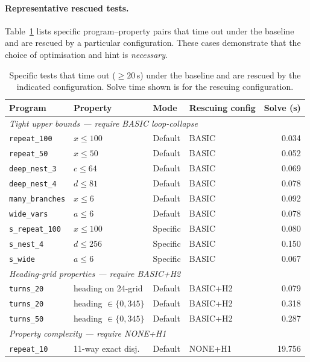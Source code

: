 \paragraph{Representative rescued tests.}
Table~\ref{tab:rescued-examples-m3} lists specific program--property pairs that
time out under the baseline and are rescued by a particular configuration.
These cases demonstrate that the choice of optimisation and hint is
\emph{necessary}.

\begin{table}[H]
\centering
\small
\caption{Specific tests that time out ($\geq20$\,s) under the baseline and are
rescued by the indicated configuration.  Solve time shown is for the rescuing
configuration.}
\label{tab:rescued-examples-m3}
\begin{tabular}{llllr}
\toprule
\textbf{Program} & \textbf{Property} & \textbf{Mode} & \textbf{Rescuing config} & \textbf{Solve (s)} \\
\midrule
\multicolumn{5}{l}{\textit{Tight upper bounds --- require BASIC loop-collapse}} \\
\midrule
\texttt{repeat\_100}  & $x \leq 100$         & Default   & BASIC      & 0.034 \\
\texttt{repeat\_50}   & $x \leq 50$          & Default   & BASIC      & 0.052 \\
\texttt{deep\_nest\_3}& $c \leq 64$          & Default   & BASIC      & 0.069 \\
\texttt{deep\_nest\_4}& $d \leq 81$          & Default   & BASIC      & 0.078 \\
\texttt{many\_branches}& $x \leq 6$          & Default   & BASIC      & 0.092 \\
\texttt{wide\_vars}   & $a \leq 6$           & Default   & BASIC      & 0.078 \\
\texttt{s\_repeat\_100}& $x \leq 100$        & Specific  & BASIC      & 0.080 \\
\texttt{s\_nest\_4}   & $d \leq 256$         & Specific  & BASIC      & 0.150 \\
\texttt{s\_wide}      & $a \leq 6$           & Specific  & BASIC      & 0.067 \\
\midrule
\multicolumn{5}{l}{\textit{Heading-grid properties --- require BASIC+H2}} \\
\midrule
\texttt{turns\_20}    & heading on 24-grid   & Default   & BASIC+H2   & 0.079 \\
\texttt{turns\_20}    & heading $\in\{0,345\}$ & Default & BASIC+H2   & 0.318 \\
\texttt{turns\_50}    & heading $\in\{0,345\}$ & Default & BASIC+H2   & 0.287 \\
\midrule
\multicolumn{5}{l}{\textit{Property complexity --- require NONE+H1}} \\
\midrule
\texttt{repeat\_10}   & 11-way exact disj.   & Default   & NONE+H1    & 19.756 \\
\bottomrule
\end{tabular}
\end{table}


